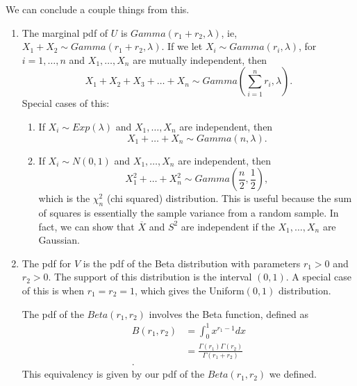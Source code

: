 We can conclude a couple things from this.
\begin{enumerate}
	\item The marginal pdf of $U$ is $Gamma\left( r_1 + r_2, \lambda \right) $, ie, $X_1 + X_2 \sim Gamma\left( r_1 + r_2, \lambda \right) $. If we let $X_i \sim Gamma\left( r_i , \lambda \right) $, for $i = 1, \ldots, n $ and $X_{1} , \ldots , X_{n}$ are mutually independent, then 
		\[
			X_1 + X_2 + X_3 + \ldots + X_{n} \sim Gamma\left( \sum_{i=1}^{n} r_{i}, \lambda \right) 
		.\]
		Special cases of this:
		\begin{enumerate}
			\item If $X_{i} \sim Exp\left( \lambda \right) $ and $X_{1} , \ldots , X_{n}$ are independent, then 
				\[
					X_1 + \ldots + X_{n} \sim Gamma\left( n, \lambda \right) 
				.\] 
			\item If $X_{i}\sim N\left( 0, 1 \right) $ and $X_{1} , \ldots , X_{n}$ are independent, then
				\[
					X_1 ^{2} + \ldots + X_{n}^{2} \sim Gamma\left( \frac{n}{2}, \frac{1}{2} \right) 
				,\] 
				which is the $\chi ^{2}_{n}$ (chi squared) distribution. This is useful because the sum of squares is essentially the sample variance from a random sample. In fact, we can show that $\overline{X}$ and $S^2$ are independent if the $X_{1} , \ldots , X_{n}$ are Gaussian.
		\end{enumerate}
	\item The pdf for $V$ is the pdf of the Beta distribution with parameters $r_1 > 0$ and $r_2 > 0$. The support of this distribution is the interval $\left( 0,1 \right) $. A special case of this is when $r_1 = r_2 = 1$, which gives the Uniform$\left( 0, 1 \right)$ distribution.

		The pdf of the $Beta\left( r_1, r_2 \right) $ involves the Beta function, defined as
		\begin{align*}
			B\left( r_1, r_2 \right) &= \int_{0}^{1} x^{r_1 - 1}dx \\
						 &= \frac{\Gamma\left( r_1 \right) \Gamma\left( r_2 \right) }{\Gamma\left( r_1 + r_2 \right) } \\
		.\end{align*}
		This equivalency is given by our pdf of the $Beta\left( r_1, r_2 \right) $ we defined.
\end{enumerate}

